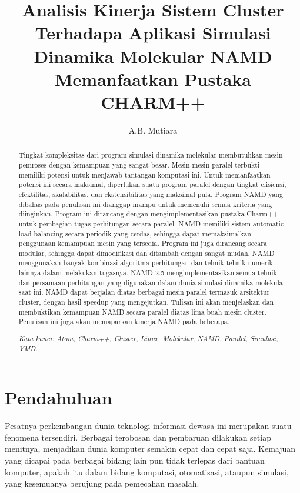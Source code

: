 \documentclass[aps,showpacs,pre,floatfix]{revtex4}
\begin{document}
\title{Analisis Kinerja Sistem Cluster Terhadapa Aplikasi Simulasi
Dinamika Molekular NAMD Memanfaatkan Pustaka CHARM++}
\author{A.B. Mutiara}


\begin{abstract}

Tingkat kompleksitas dari program simulasi dinamika molekular
membutuhkan mesin pemroses dengan kemampuan yang sangat besar.
Mesin-mesin paralel terbukti memiliki potensi untuk menjawab
tantangan komputasi ini. Untuk memanfaatkan potensi ini secara
maksimal, diperlukan suatu program paralel dengan tingkat
efisiensi, efektifitas, skalabilitas, dan ekstensibilitas yang
maksimal pula.  Program NAMD yang dibahas pada penulisan ini
dianggap mampu untuk memenuhi semua kriteria yang diinginkan.
Program ini dirancang dengan mengimplementasikan pustaka Charm++
untuk pembagian tugas perhitungan secara paralel. NAMD memiliki
sistem automatic load balancing secara periodik yang cerdas,
sehingga dapat memaksimalkan penggunaan kemampuan mesin yang
tersedia. Program ini juga dirancang secara modular, sehingga
dapat dimodifikasi dan ditambah dengan sangat mudah. NAMD
menggunakan banyak kombinasi algoritma perhitungan dan
tehnik-tehnik numerik lainnya dalam melakukan tugasnya. NAMD 2.5
mengimplementasikan semua tehnik dan persamaan perhitungan yang
digunakan dalam dunia simulasi dinamika molekular saat ini. NAMD
dapat berjalan diatas berbagai mesin paralel termasuk arsitektur
cluster, dengan hasil speedup yang mengejutkan. Tulisan ini akan
menjelaskan dan membuktikan kemampuan NAMD secara paralel diatas
lima buah mesin cluster. Penulisan ini juga akan memaparkan
kinerja NAMD pada beberapa.

\textit{Kata kunci: Atom, Charm++, Cluster, Linux, Molekular,
NAMD, Paralel, Simulasi, VMD.}
\end{abstract}
\maketitle


\section{Pendahuluan}

Pesatnya perkembangan dunia teknologi informasi dewasa ini
merupakan suatu fenomena tersendiri. Berbagai terobosan dan
pembaruan dilakukan setiap menitnya, menjadikan dunia komputer
semakin cepat dan cepat saja. Kemajuan yang dicapai pada berbagai
bidang lain pun tidak terlepas dari bantuan komputer, apakah itu
dalam bidang komputasi, otomatisasi, ataupun simulasi, yang
kesemuanya berujung pada pemecahan masalah.
\end{document}
